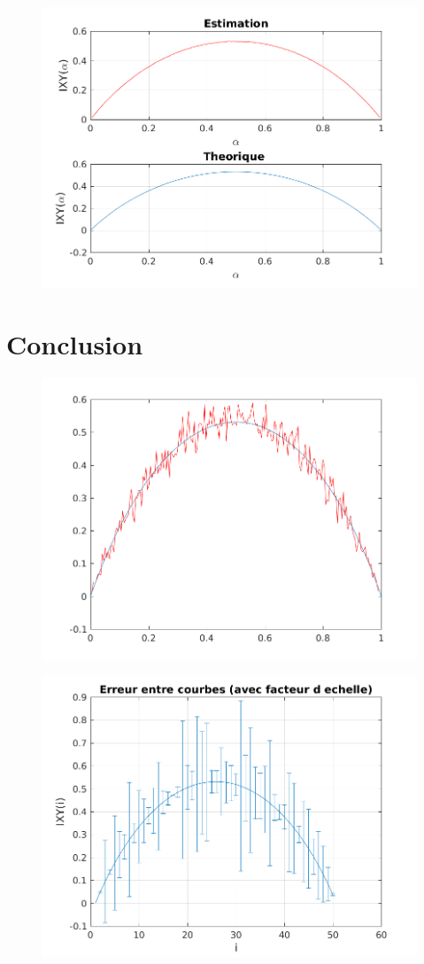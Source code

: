 \documentclass{report}
\begin{document}
\begin{figure}[h]
	\centering
	\captionsetup{justification=centering}
	\includegraphics[width=0.6\linewidth]{../canal3}
	\caption{}
	\label{fig:}
\end{figure}


\section{Conclusion}


\begin{figure}[h]
	\centering
	\captionsetup{justification=centering}
	\includegraphics[width=0.7\linewidth]{../canal21}
	\caption{}
	\label{fig:}
\end{figure}


\begin{figure}[h]
	\centering
	\captionsetup{justification=centering}
	\includegraphics[width=0.7\linewidth]{../canal22}
	\caption{}
	\label{fig:}
\end{figure}
\end{document}
